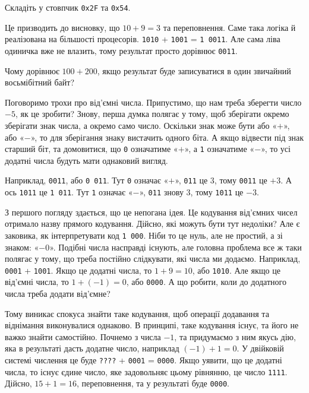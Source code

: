 \documentclass{book}
\newcommand{\bitstr}[1]{{\tt #1}}
\newcommand{\hexstr}[1]{{\tt 0x#1}}
\begin{document}
\begin{exercise}
Складіть у стовпчик \hexstr{2F} та \hexstr{54}.
\end{exercise}

Це призводить до висновку, що $10 + 9 = 3$ та переповнення.
Саме така логіка й реалізована на більшості процесорів.
\bitstr{1010} + \bitstr{1001} = \bitstr{1~0011}.
Але сама ліва одиничка вже не влазить, тому результат просто дорівнює \bitstr{0011}.

\begin{exercise}
Чому дорівнює $100 + 200$, якщо результат буде записуватися в один звичайний восьмібітний байт?
\end{exercise}

\medskip

Поговоримо трохи про від'ємні числа.
Припустимо, що нам треба зберегти число $-5$, як це зробити?
Знову, перша думка полягає у тому, щоб зберігати окремо зберігати знак числа, а окремо само число.
Оскільки знак може бути або «$+$», або «$-$», то для зберігання знаку вистачить одного біта.
А якщо відвести під знак старший біт, та домовитися, що \bitstr{0} означатиме «$+$», а \bitstr{1} означатиме «$-$», то усі додатні числа будуть мати однаковий вигляд.

Наприклад, \bitstr{0011}, або \bitstr{0~011}.
Тут \bitstr{0} означає «$+$», \bitstr{011} це $3$, тому \bitstr{0011} це $+3$.
А ось \bitstr{1011} це \bitstr{1~011}.
Тут \bitstr{1} означає «$-$», \bitstr{011} знову $3$, тому \bitstr{1011} це $-3$.

З першого погляду здається, що це непогана ідея.
Це кодування від'ємних чисел отримало назву прямого кодування.
Дійсно, які можуть бути тут недоліки?
Але є заковика, як інтерпретувати код \bitstr{1~000}.
Ніби то це нуль, але не простий, а зі знаком: «$-0$».
Подібні числа насправді існують, але головна проблема все ж таки полягає у тому, що треба постійно слідкувати, які числа ми додаємо.
Наприклад, \bitstr{0001} + \bitstr{1001}.
Якщо це додатні числа, то $1 + 9 = 10$, або \bitstr{1010}.
Але якщо це від'ємні числа, то $1 + (-1) = 0$, або \bitstr{0000}.
А що робити, коли до додатного числа треба додати від'ємне?

Тому виникає спокуса знайти таке кодування, щоб операції додавання та віднімання виконувалися однаково.
В принципі, таке кодування існує, та його не важко знайти самостійно.
Почнемо з числа $-1$, та придумаємо з ним якусь дію, яка в результаті дасть додатне число, наприклад $(-1) + 1 = 0$.
У двійковій системі числення це буде \bitstr{????} + \bitstr{0001} = \bitstr{0000}.
Якщо уявити, що це додатні числа, то існує єдине число, яке задовольняє цьому рівнянню, це число \bitstr{1111}.
Дійсно, $15 + 1 = 16$, переповнення, та у результаті буде \bitstr{0000}.
\end{document}
